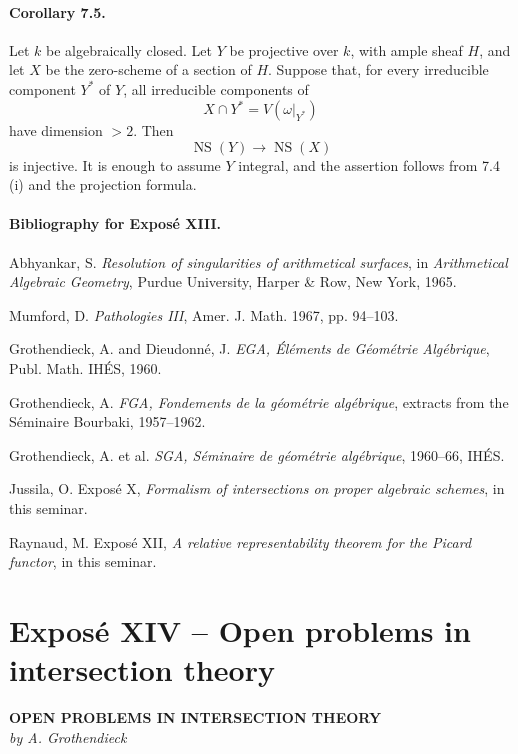 \documentclass[12pt]{article}
\newcommand{\NS}{\operatorname{NS}}
\newcommand{\longto}{\longrightarrow}
\begin{document}
\paragraph{Corollary 7.5.}
Let $k$ be algebraically closed. Let $Y$ be projective over $k$, with ample sheaf $H$, and let $X$ be the zero-scheme of a section of $H$. Suppose that, for every irreducible component $Y^*$ of $Y$, all irreducible components of
\[
X\cap Y^*=V(\omega|_{Y^*})
\]
have dimension $>2$. Then
\[
\NS(Y)\longto \NS(X)
\]
is injective. It is enough to assume $Y$ integral, and the assertion follows from 7.4 (i) and the projection formula.

\paragraph{Bibliography for Exposé XIII.}
\begin{enumerate}[label={[\arabic*]}]
\item Abhyankar, S. \emph{Resolution of singularities of arithmetical surfaces}, in \emph{Arithmetical Algebraic Geometry}, Purdue University, Harper \& Row, New York, 1965.
\item Mumford, D. \emph{Pathologies III}, Amer. J. Math. 1967, pp. 94--103.
\item Grothendieck, A. and Dieudonné, J. \emph{EGA, Éléments de Géométrie Algébrique}, Publ. Math. IHÉS, 1960.
\item Grothendieck, A. \emph{FGA, Fondements de la géométrie algébrique}, extracts from the Séminaire Bourbaki, 1957--1962.
\item Grothendieck, A. et al. \emph{SGA, Séminaire de géométrie algébrique}, 1960--66, IHÉS.
\item Jussila, O. Exposé X, \emph{Formalism of intersections on proper algebraic schemes}, in this seminar.
\item Raynaud, M. Exposé XII, \emph{A relative representability theorem for the Picard functor}, in this seminar.
\end{enumerate}

\newpage
\section*{Exposé XIV -- Open problems in intersection theory}
\begin{center}
\large\textbf{OPEN PROBLEMS IN INTERSECTION THEORY}\\[0.25em]
\textit{by A. Grothendieck}
\end{center}
\end{document}
